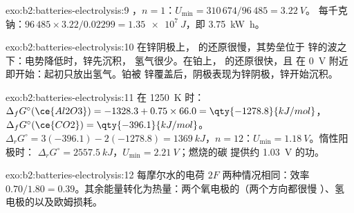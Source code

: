 \begin{solution}{exo:b2:batteries-electrolysis:9}
，$n = 1$：$U_{\min} = 310\,674/96\,485 = \qty{3.22}{V}$。
每千克钠：$96\,485 \times 3.22/0.02299 = \qty{1.35e7}{J}$，即
\qty{3.75}{kW.h}。
\end{solution}

\begin{solution}{exo:b2:batteries-electrolysis:10}
在锌阴极上， 的还原很慢，其势垒位于
锌的波之下：电势降低时，锌先沉积，
氢气很少。在铂上， 的还原很快，且
在 \qty{0}{V} 附近即开始：起初只放出氢气。铂被
锌覆盖后，阴极表现为锌阴极，锌开始沉积。
\end{solution}

\begin{solution}{exo:b2:batteries-electrolysis:11}
在 \qty{1250}{K} 时：$\Delta_f G^\circ(\ce{Al2O3}) = -1328.3 + 0.75 \times 66.0 =
\qty{-1278.8}{kJ/mol}$，$\Delta_f G^\circ(\ce{CO2}) = \qty{-396.1}{kJ/mol}$。$\Delta_r G^\circ =
3(-396.1) - 2(-1278.8) = \qty{1369}{kJ}$，$n = 12$：$U_{\min} = \qty{1.18}{V}$。惰性阳极时：
$\Delta_r G^\circ = \qty{2557.5}{kJ}$，$U_{\min} = \qty{2.21}{V}$；燃烧的碳
提供约 \qty{1.03}{V} 的功。
\end{solution}

\begin{solution}{exo:b2:batteries-electrolysis:12}
每摩尔水的电荷 $2F$ 两种情况相同：效率 $0.70/1.80 =
0.39$。其余能量转化为热量：两个氧电极的（两个方向都很慢
）、氢电极的以及欧姆损耗。
\end{solution}

